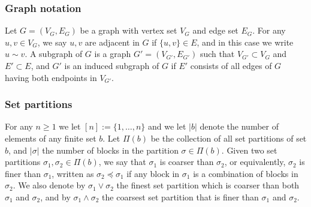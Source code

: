 \documentclass[12pt]{article}
\numberwithin{equation}{section}
\begin{document}
\subsubsection*{Graph notation} 
\noindent 
Let $G=(V_G,E_G)$ be a graph with vertex set $V_G$ and edge set $E_G$. For any $u,v\in V_G$, we say $u,v$ are adjacent in $G$ if $\{u,v\}\in E$, and in this case we write $u\sim v$.
A subgraph of $G$ is a graph $G'=(V_{G'},E_{G'})$ such that $V_{G'}\subset V_G$ and $E'\subset E$, and $G'$ is an induced subgraph of $G$ if $E'$ consists of all edges of $G$ having both endpoints in $V_{G'}$.
\subsubsection*{Set partitions}
\noindent
For any $n\geq 1$ we let $[n]:=\{1, \ldots ,n\}$ and we let $|b|$ denote the number of elements of any finite set $b$. Let $\Pi (b)$ be the collection of all set partitions of set $b$, and $|\sigma|$ the number of blocks in the partition $\sigma\in\Pi(b)$.
 Given two set partitions $\sigma_1,\sigma_2\in\Pi(b)$, we say that $\sigma_1$ is coarser than $\sigma_2$, or equivalently, $\sigma_2$ is finer than $\sigma_1$, written as $\sigma_2\preceq\sigma_1$ if any block in $\sigma_1$ is a combination of blocks in $\sigma_2$.
We also denote by $\sigma_1\vee\sigma_2$ the finest set partition which is coarser than both $\sigma_1$ and $\sigma_2$, and by $\sigma_1\wedge\sigma_2$ the coarsest set partition that is finer than $\sigma_1$ and $\sigma_2$. 
\end{document}
